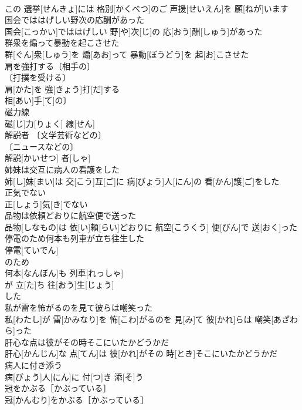 \documentclass[8pt]{extreport}
\begin{document}
\begin{CJK}{UTF8}{min}
\\	この 選挙[せんきょ]には 格別[かくべつ]のご 声援[せいえん]を 願[ねが]います
\\	国会でははげしい野次の応酬があった	
\\	国会[こっかい]でははげしい 野[や]次[じ]の 応[おう]酬[しゅう]があった
\\	群衆を煽って暴動を起こさせた	
\\	群[ぐん]衆[しゅう]を 煽[あお]って 暴動[ぼうどう]を 起[お]こさせた
\\	肩を強打する〔相手の〕	
\\	〔打撲を受ける〕
\\	肩[かた]を 強[きょう]打[だ]する
\\	相[あい]手[て]の〕
\\	磁力線	
\\	磁[じ]力[りょく] 線[せん]
\\	解説者	〔文学芸術などの〕
\\	〔ニュースなどの〕
\\	解説[かいせつ] 者[しゃ]
\\	姉妹は交互に病人の看護をした	
\\	姉[し]妹[まい]は 交[こう]互[ご]に 病[びょう]人[にん]の 看[かん]護[ご]をした
\\	正気でない	
\\	正[しょう]気[き]でない
\\	品物は依頼どおりに航空便で送った	
\\	品物[しなもの]は 依[い]頼[らい]どおりに 航空[こうくう] 便[びん]で 送[おく]った
\\	停電のため何本も列車が立ち往生した	
\\	停電[ていでん]
\\	のため 
\\	何本[なんぼん]も 列車[れっしゃ]
\\	が 立[た]ち 往[おう]生[じょう]
\\	した
\\	私が雷を怖がるのを見て彼らは嘲笑った	
\\	私[わたし]が 雷[かみなり]を 怖[こわ]がるのを 見[み]て 彼[かれ]らは 嘲笑[あざわら]った
\\	肝心な点は彼がその時そこにいたかどうかだ	
\\	肝心[かんじん]な 点[てん]は 彼[かれ]がその 時[とき]そこにいたかどうかだ
\\	病人に付き添う	
\\	病[びょう]人[にん]に 付[つ]き 添[そ]う
\\	冠をかぶる［かぶっている］	
\\	冠[かんむり]をかぶる［かぶっている］

\end{CJK}
\end{document}
